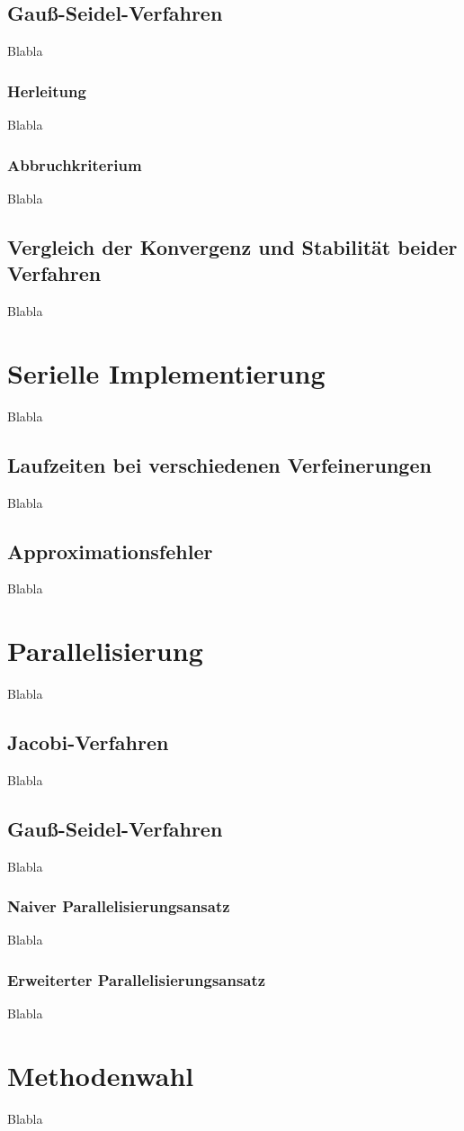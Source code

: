 \documentclass{article}
\begin{document}
\subsection{Gauß-Seidel-Verfahren}
Blabla
\subsubsection{Herleitung}
Blabla
\subsubsection{Abbruchkriterium}
Blabla

\subsection{Vergleich der Konvergenz und Stabilität beider Verfahren}
Blabla

\section{Serielle Implementierung}
Blabla
\subsection{Laufzeiten bei verschiedenen Verfeinerungen}
Blabla
\subsection{Approximationsfehler}
Blabla

\section{Parallelisierung}
Blabla
\subsection{Jacobi-Verfahren}
Blabla
\subsection{Gauß-Seidel-Verfahren}
Blabla
\subsubsection{Naiver Parallelisierungsansatz}
Blabla
\subsubsection{Erweiterter Parallelisierungsansatz}
Blabla

\section{Methodenwahl}
Blabla
\end{document}
